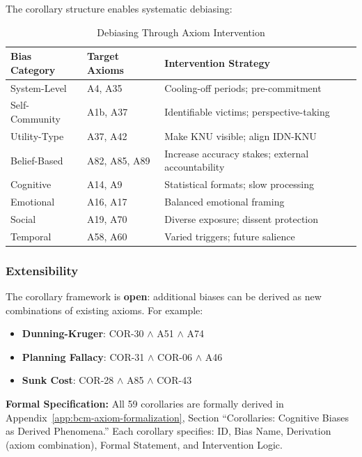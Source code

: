 The corollary structure enables systematic debiasing:

\begin{table}[htbp]
\centering
\caption{Debiasing Through Axiom Intervention}
\label{tab:debiasing-axiom}
\renewcommand{\arraystretch}{1.3}
\begin{tabular}{@{}lll@{}}
\toprule
\textbf{Bias Category} & \textbf{Target Axioms} & \textbf{Intervention Strategy} \\
\midrule
System-Level & A4, A35 & Cooling-off periods; pre-commitment \\
Self-Community & A1b, A37 & Identifiable victims; perspective-taking \\
Utility-Type & A37, A42 & Make KNU visible; align IDN-KNU \\
Belief-Based & A82, A85, A89 & Increase accuracy stakes; external accountability \\
Cognitive & A14, A9 & Statistical formats; slow processing \\
Emotional & A16, A17 & Balanced emotional framing \\
Social & A19, A70 & Diverse exposure; dissent protection \\
Temporal & A58, A60 & Varied triggers; future salience \\
\bottomrule
\end{tabular}
\end{table}

\subsubsection{Extensibility}

The corollary framework is \textbf{open}: additional biases can be derived as new combinations of existing axioms. For example:

\begin{itemize}
\item \textbf{Dunning-Kruger}: COR-30 $\land$ A51 $\land$ A74
\item \textbf{Planning Fallacy}: COR-31 $\land$ COR-06 $\land$ A46
\item \textbf{Sunk Cost}: COR-28 $\land$ A85 $\land$ COR-43
\end{itemize}

\begin{cross-reference}
\textbf{Formal Specification:} All 59 corollaries are formally derived in Appendix~\ref{app:bcm-axiom-formalization}, Section ``Corollaries: Cognitive Biases as Derived Phenomena.'' Each corollary specifies: ID, Bias Name, Derivation (axiom combination), Formal Statement, and Intervention Logic.
\end{cross-reference}

